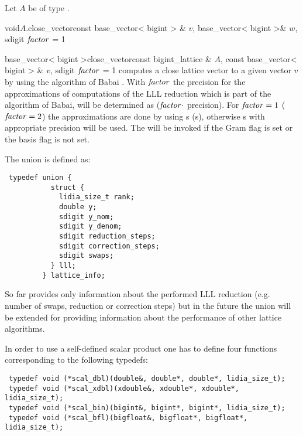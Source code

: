 

Let $A$ be of type .

\begin{fcode}{void}{$A$.close_vector}{const base_vector< bigint > & $v$,
    base_vector< bigint >& $w$, sdigit $\mathit{factor}$ = 1}%
\end{fcode}

\begin{fcode}{base_vector< bigint >}{close_vector}{const bigint_lattice & $A$,
    const base_vector< bigint > & $v$, sdigit $\mathit{factor}$ = 1}%
  computes a close lattice vector to a given vector $v$ by using the algorithm of Babai
  \cite{Babai:1986}.  With $\mathit{factor}$ the precision for the approximations of computations of the
  LLL reduction which is part of the algorithm of Babai, will be determined as ($\mathit{factor} \cdot$
   precision).  For $\mathit{factor} = 1$ ($\mathit{factor} = 2$) the approximations are done by using
  s (s), otherwise s with appropriate precision will
  be used.  The \LEH will be invoked if the Gram flag is set or the basis flag is not set.

\end{fcode}




The union  is defined as:
\begin{verbatim}
 typedef union {
           struct {
             lidia_size_t rank;
             double y;
             sdigit y_nom;
             sdigit y_denom;
             sdigit reduction_steps;
             sdigit correction_steps;
             sdigit swaps;
           } lll;
         } lattice_info;
\end{verbatim}
So far  provides only information about the performed LLL reduction (e.g.
number of swaps, reduction or correction steps) but in the future the union will be extended for
providing information about the performance of other lattice algorithms.

In order to use a self-defined scalar product one has to define four functions corresponding to
the following typedefs:

\begin{verbatim}
 typedef void (*scal_dbl)(double&, double*, double*, lidia_size_t);
 typedef void (*scal_xdbl)(xdouble&, xdouble*, xdouble*, lidia_size_t);
 typedef void (*scal_bin)(bigint&, bigint*, bigint*, lidia_size_t);
 typedef void (*scal_bfl)(bigfloat&, bigfloat*, bigfloat*, lidia_size_t);
\end{verbatim}

